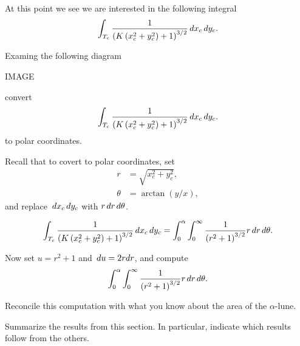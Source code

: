 \documentclass{ximera}
\begin{document}
At this point we see we are interested in the following integral
\[
\int_{T_c} \frac{1}{\left(K\left(x_c^2+y_c^2\right)+1\right)^{3/2}} \,d x_c\,d y_c.
\]

\begin{problem}
  Examing the following diagram
  \begin{image}
    IMAGE
  \end{image}
  convert
  \[
  \int_{T_c} \frac{1}{\left(K\left(x_c^2+y_c^2\right)+1\right)^{3/2}} \,d x_c\,d y_c.
  \]
  to polar coordinates.
  \begin{hint}
    Recall that to covert to polar coordinates, set
    \begin{align*}
      r &= \sqrt{x_c^2+y_c^2},\\
      \theta &= \arctan(y/x),
    \end{align*}
    and replace $\,d x_c\,d y_c$ with $r\,d r\,d \theta$.
  \end{hint}
  \begin{freeResponse}
    \[
    \int_{T_c}
    \frac{1}{\left(K\left(x_c^2+y_c^2\right)+1\right)^{3/2}} \,d x_c\,d
    y_c = \int_0^\alpha \int_0^\infty \frac{1}{\left(r^2+1\right)^{3/2}} r\,d r \,d \theta.
    \]
  \end{freeResponse}
\end{problem}

\begin{problem}
  Now set $u= r^2+1$ and $\,d u = 2rdr$, and compute
  \[
  \int_0^\alpha \int_0^\infty \frac{1}{\left(r^2+1\right)^{3/2}} r\,d r \,d \theta.
  \]
\end{problem}

\begin{problem}
  Reconcile this computation with what you know about the area of the
  $\alpha$-lune.
\end{problem}

\begin{problem}
Summarize the results from this section. In particular, indicate which
results follow from the others.
\begin{freeResponse}
\end{freeResponse}
\end{problem}
\end{document}
